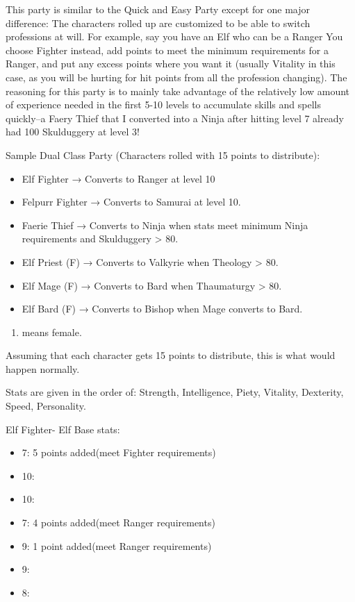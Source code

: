 \documentclass[12pt]{article}
\providecommand{\tightlist}{%
  \setlength{\itemsep}{0pt}\setlength{\parskip}{0pt}}
\begin{document}
This party is similar to the Quick and Easy Party except for one major
difference: The characters rolled up are customized to be able to switch
professions at will. For example, say you have an Elf who can be a
Ranger You choose Fighter instead, add points to meet the minimum
requirements for a Ranger, and put any excess points where you want it
(usually Vitality in this case, as you will be hurting for hit points
from all the profession changing). The reasoning for this party is to
mainly take advantage of the relatively low amount of experience needed
in the first 5-10 levels to accumulate skills and spells quickly--a
Faery Thief that I converted into a Ninja after hitting level 7 already
had 100 Skulduggery at level 3!

Sample Dual Class Party (Characters rolled with 15 points to
distribute):

\begin{itemize}
\tightlist
\item
  Elf Fighter → Converts to Ranger at level 10
\item
  Felpurr Fighter → Converts to Samurai at level 10.
\item
  Faerie Thief → Converts to Ninja when stats meet minimum Ninja
  requirements and Skulduggery \textgreater{} 80.
\item
  Elf Priest (F) → Converts to Valkyrie when Theology \textgreater{} 80.
\item
  Elf Mage (F) → Converts to Bard when Thaumaturgy \textgreater{} 80.
\item
  Elf Bard (F) → Converts to Bishop when Mage converts to Bard.
\end{itemize}

\begin{enumerate}
\def\labelenumi{(\Alph{enumi})}
\setcounter{enumi}{5}
\tightlist
\item
  means female.
\end{enumerate}

Assuming that each character gets 15 points to distribute, this is what
would happen normally.

Stats are given in the order of: Strength, Intelligence, Piety,
Vitality, Dexterity, Speed, Personality.

Elf Fighter- Elf Base stats:

\begin{itemize}
\tightlist
\item
  7: 5 points added(meet Fighter requirements)
\item
  10:
\item
  10:
\item
  7: 4 points added(meet Ranger requirements)
\item
  9: 1 point added(meet Ranger requirements)
\item
  9:
\item
  8:
\end{itemize}
\end{document}
